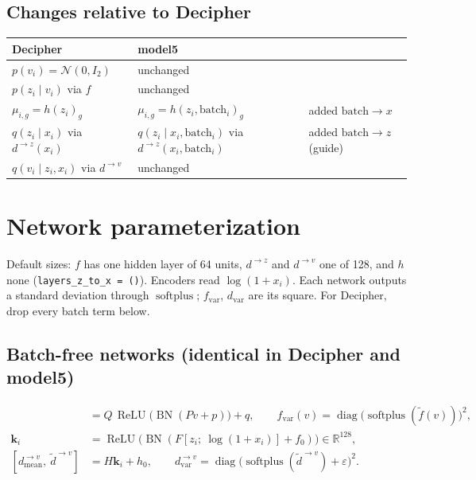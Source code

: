 \documentclass{article}
\newcommand{\batch}{\mathrm{batch}}
\DeclareMathOperator{\softplus}{softplus}
\DeclareMathOperator{\ReLU}{ReLU}
\DeclareMathOperator{\BN}{BN}
\DeclareMathOperator{\diag}{diag}
\begin{document}
\subsection{Changes relative to Decipher}
\begin{center}
\begin{tabular}{lll}
\toprule
Decipher & model5 & \\
\midrule
$p(v_i) = \mathcal{N}(0, I_2)$ & unchanged & \\
$p(z_i \mid v_i)$ via $f$ & unchanged & \\
$\mu_{i,g} = h(z_i)_g$ & $\mu_{i,g} = h(z_i, \batch_i)_g$ & added $\batch \to x$ \\
$q(z_i \mid x_i)$ via $d^{\to z}(x_i)$ & $q(z_i \mid x_i, \batch_i)$ via $d^{\to z}(x_i, \batch_i)$ & added $\batch \to z$ (guide) \\
$q(v_i \mid z_i, x_i)$ via $d^{\to v}$ & unchanged & \\
\bottomrule
\end{tabular}
\end{center}

\section{Network parameterization}

Default sizes: $f$ has one hidden layer of 64 units, $d^{\to z}$ and $d^{\to v}$ one of 128,
and $h$ none (\texttt{layers\_z\_to\_x = ()}). Encoders read $\log(1 + x_i)$. Each network
outputs a standard deviation through $\softplus$; $f_{\mathrm{var}}$, $d_{\mathrm{var}}$ are
its square. For Decipher, drop every batch term below.

\subsection{Batch-free networks (identical in Decipher and model5)}
\begin{align*}
[f_{\mathrm{mean}}(v),\ \tilde f(v)] &= Q \,\ReLU\!\big(\BN(P v + p)\big) + q,
\qquad f_{\mathrm{var}}(v) = \diag\!\big(\softplus(\tilde f(v))\big)^2, \\
\mathbf{k}_i &= \ReLU\!\big(\BN(F [z_i;\ \log(1 + x_i)] + f_0)\big) \in \mathbb{R}^{128}, \\
[d^{\to v}_{\mathrm{mean}},\ \tilde d^{\to v}] &= H \mathbf{k}_i + h_0,
\qquad d^{\to v}_{\mathrm{var}} = \diag\!\big(\softplus(\tilde d^{\to v}) + \varepsilon\big)^2 .
\end{align*}
\end{document}
